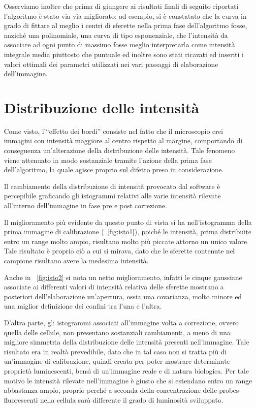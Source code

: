 Osserviamo inoltre che prima di giungere ai risultati finali di seguito riportati l'algoritmo è stato via via migliorato: ad esempio, si è constatato che la curva in grado di fittare al meglio i centri di sferette nella prima fase dell'algoritmo fosse, anziché una polinomiale, una curva di tipo esponenziale, che l'intensità da associare ad ogni punto di massimo fosse meglio interpretarla come intensità integrale media piuttosto che puntuale ed inoltre sono stati ricavati ed inseriti i valori ottimali dei parametri utilizzati nei vari passaggi di elaborazione dell'immagine.

\section{Distribuzione delle intensità}

Come visto, l'``effetto dei bordi'' consiste nel fatto che il microscopio crei immagini con intensità maggiore al centro rispetto al margine, comportando di conseguenza un'alterazione della distribuzione delle intensità. 
Tale fenomeno viene attenuato in modo sostanziale tramite l'azione della prima fase dell'algoritmo, la quale agisce proprio sul difetto preso in considerazione.

Il cambiamento della distribuzione di intensità provocato dal software è percepibile graficando gli istogrammi relativi alle varie intensità rilevate all'interno dell'immagine in fase pre e post correzione.

Il miglioramento più evidente da questo punto di vista si ha nell'istogramma della prima immagine di calibrazione (\figurename~\ref{fig:isto1}), poiché le intensità, prima distribuite entro un range molto ampio, risultano molto più piccate attorno un unico valore.
Tale risultato è proprio ciò a cui si mirava, dato che le sferette contenute nel campione risultano avere la medesima intensità.

Anche in \figurename~\ref{fig:isto2} si nota un netto miglioramento, infatti le cinque gaussiane associate ai differenti valori di intensità relativa delle sferette mostrano a posteriori dell'elaborazione un'apertura, ossia una covarianza, molto minore ed una miglior definizione dei confini tra l'una e l'altra. 

D'altra parte, gli istogrammi associati all'immagine volta a correzione, ovvero quella delle cellule, non presentano sostanziali cambiamenti, a meno di una migliore simmetria della distribuzione delle intensità presenti nell'immagine.
Tale risultato era in realtà prevedibile, dato che in tal caso non si tratta più di un'immagine di calibrazione, quindi creata per poter mostrare determinate proprietà luminescenti, bensì di un'immagine reale e di natura biologica. 
Per tale motivo le intensità rilevate nell'immagine è giusto che si estendano entro un range abbastanza ampio, proprio perché a seconda della concentrazione delle probes fluorescenti nella cellula sarà differente il grado di luminosità sviluppato.

